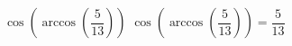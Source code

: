  {$\cos\left(\arccos\left(\dfrac{5}{13}\right)\right)$}
{ $\cos\left(\arccos\left(\dfrac{5}{13}\right)\right) = \dfrac{5}{13}$}
